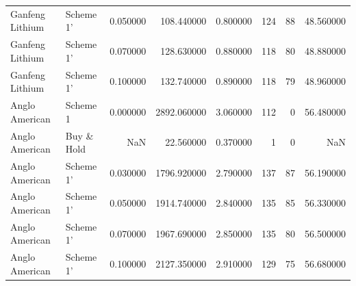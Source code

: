 \begin{longtable}{llrrrrrr}
Ganfeng Lithium & Scheme 1' & 0.050000 & 108.440000 & 0.800000 & 124 & 88 & 48.560000 \\
Ganfeng Lithium & Scheme 1' & 0.070000 & 128.630000 & 0.880000 & 118 & 80 & 48.880000 \\
Ganfeng Lithium & Scheme 1' & 0.100000 & 132.740000 & 0.890000 & 118 & 79 & 48.960000 \\
Anglo American & Scheme 1 & 0.000000 & 2892.060000 & 3.060000 & 112 & 0 & 56.480000 \\
Anglo American & Buy \& Hold & NaN & 22.560000 & 0.370000 & 1 & 0 & NaN \\
Anglo American & Scheme 1' & 0.030000 & 1796.920000 & 2.790000 & 137 & 87 & 56.190000 \\
Anglo American & Scheme 1' & 0.050000 & 1914.740000 & 2.840000 & 135 & 85 & 56.330000 \\
Anglo American & Scheme 1' & 0.070000 & 1967.690000 & 2.850000 & 135 & 80 & 56.500000 \\
Anglo American & Scheme 1' & 0.100000 & 2127.350000 & 2.910000 & 129 & 75 & 56.680000 \\
\end{longtable}
